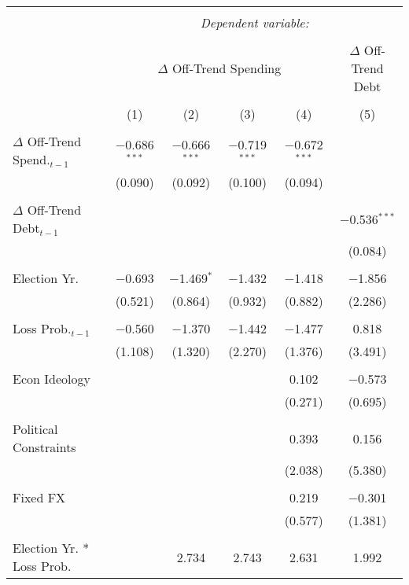 
\begingroup 
\tiny 
\begin{tabular}{@{\extracolsep{5pt}}lccccc} 
\\[-1.8ex]\hline 
\hline \\[-1.8ex] 
 & \multicolumn{5}{c}{\textit{Dependent variable:}} \\ 
\cline{2-6} 
\\[-1.8ex] & \multicolumn{4}{c}{$\Delta$ Off-Trend Spending} & $\Delta$ Off-Trend Debt \\ 
\\[-1.8ex] & (1) & (2) & (3) & (4) & (5)\\ 
\hline \\[-1.8ex] 
 $\Delta$ Off-Trend Spend.$_{t-1}$ & $-$0.686$^{***}$ & $-$0.666$^{***}$ & $-$0.719$^{***}$ & $-$0.672$^{***}$ &  \\ 
  & (0.090) & (0.092) & (0.100) & (0.094) &  \\ 
  & & & & & \\ 
 $\Delta$ Off-Trend Debt$_{t-1}$ &  &  &  &  & $-$0.536$^{***}$ \\ 
  &  &  &  &  & (0.084) \\ 
  & & & & & \\ 
 Election Yr. & $-$0.693 & $-$1.469$^{*}$ & $-$1.432 & $-$1.418 & $-$1.856 \\ 
  & (0.521) & (0.864) & (0.932) & (0.882) & (2.286) \\ 
  & & & & & \\ 
 Loss Prob.$_{t-1}$ & $-$0.560 & $-$1.370 & $-$1.442 & $-$1.477 & 0.818 \\ 
  & (1.108) & (1.320) & (2.270) & (1.376) & (3.491) \\ 
  & & & & & \\ 
 Econ Ideology &  &  &  & 0.102 & $-$0.573 \\ 
  &  &  &  & (0.271) & (0.695) \\ 
  & & & & & \\ 
 Political Constraints &  &  &  & 0.393 & 0.156 \\ 
  &  &  &  & (2.038) & (5.380) \\ 
  & & & & & \\ 
 Fixed FX &  &  &  & 0.219 & $-$0.301 \\ 
  &  &  &  & (0.577) & (1.381) \\ 
  & & & & & \\ 
 Election Yr. * Loss Prob. &  & 2.734 & 2.743 & 2.631 & 1.992 \\ 

\end{tabular}
